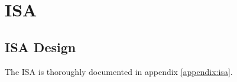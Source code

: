 \section{ISA} \label{fpga:isa:s:isa}

\subsection{ISA Design}

The ISA is thoroughly documented in appendix \vref{appendix:isa}.
